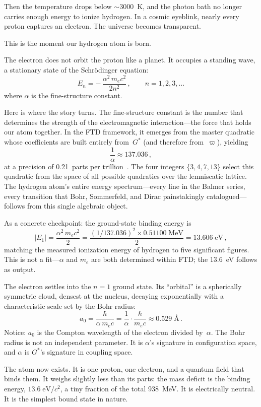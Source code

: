 \documentclass[11pt,a4paper]{article}
\newcommand{\Gstar}{G^{*}}
\newcommand{\vpi}{\varpi}
\begin{document}
Then the temperature drops below $\sim 3000$~K, and the photon bath no
longer carries enough energy to ionize hydrogen.  In a cosmic eyeblink,
nearly every proton captures an electron.  The universe becomes transparent.

This is the moment our hydrogen atom is born.

The electron does not orbit the proton like a planet.  It occupies a
standing wave, a stationary state of the Schr\"odinger equation:
\[
E_n = -\,\frac{\alpha^2\,m_e c^2}{2n^2}\,,
\qquad n=1,2,3,\ldots
\]
where $\alpha$ is the fine-structure constant.

Here is where the story turns.  The fine-structure constant is the number
that determines the strength of the electromagnetic interaction---the force
that holds our atom together.  In the FTD framework, it emerges from the
master quadratic whose coefficients are built entirely from~$\Gstar$ (and
therefore from~$\vpi$), yielding
\[
\frac{1}{\alpha}\approx 137.036\,,
\]
at a precision of 0.21~parts per trillion~\cite{codata}.  The four integers
$\{3,4,7,13\}$ select this quadratic from the space of all possible
quadratics over the lemniscatic lattice.  The hydrogen atom's entire energy
spectrum---every line in the Balmer series, every transition that Bohr,
Sommerfeld, and Dirac painstakingly catalogued---follows from this single
algebraic object.

As a concrete checkpoint: the ground-state binding energy is
\[
|E_1| = \frac{\alpha^2\,m_e c^2}{2}
= \frac{(1/137.036)^2\times 0.51100\;\text{MeV}}{2}
= 13.606\;\text{eV}\,,
\]
matching the measured ionization energy of hydrogen to five
significant figures.  This is not a fit---$\alpha$ and $m_e$ are both
determined within FTD; the 13.6~eV follows as output.

The electron settles into the $n=1$ ground state.  Its ``orbital'' is a
spherically symmetric cloud, densest at the nucleus, decaying exponentially
with a characteristic scale set by the Bohr radius:
\[
a_0 = \frac{\hbar}{\alpha\,m_e c}
= \frac{1}{\alpha}\cdot\frac{\hbar}{m_e c}
\approx 0.529\;\text{\AA}\,.
\]
Notice: $a_0$ is the Compton wavelength of the electron divided by~$\alpha$.
The Bohr radius is not an independent parameter.  It is $\alpha$'s signature
in configuration space, and $\alpha$ is $\Gstar$'s signature in coupling
space.

The atom now exists.  It is one proton, one electron, and a quantum field
that binds them.  It weighs slightly less than its parts: the mass deficit
is the binding energy, $13.6\;\text{eV}/c^2$, a tiny fraction of the total
938~MeV\@.  It is electrically neutral.  It is the simplest bound state in
nature.
\end{document}
